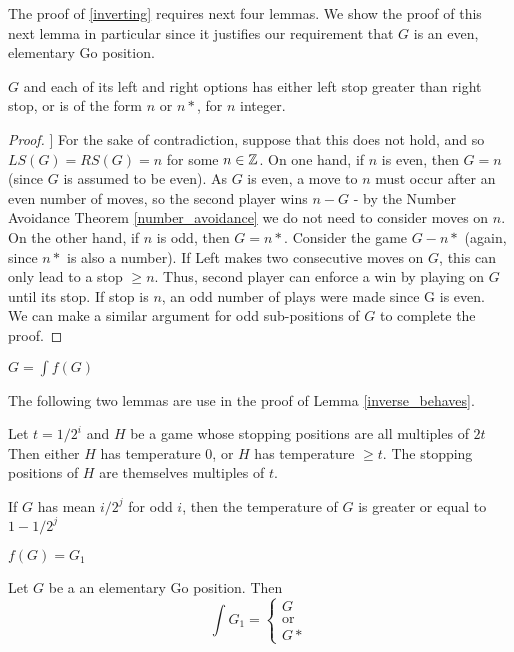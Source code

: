 \documentclass[../math194_paper.tex]{subfiles}
\begin{document}
 The proof of \ref{inverting} requires next four lemmas. We show the proof of this next
 lemma in particular since it justifies our requirement that $G$ is an even, elementary Go position.
\begin{lemma}
    $G$ and each of its left and right options has either left stop greater than 
    right stop, or is of the form $n$ or $n*$, for $n$ integer.
\end{lemma}
\begin{proof} \:
    [\cite{berlekamp1994mathematical}[\S 3.6]]
    For the sake of contradiction, suppose that this does not hold, and
    so $LS(G) = RS(G) = n$ for some $n \in \mathbb{Z}$. 
    On one hand, if $n$ is even, then $G = n$ (since $G$ is assumed to be even). As $G$ is even, 
    a move to $n$ must occur after an even number of moves, so the second player wins
    $n -G$ - by the Number Avoidance Theorem \ref{number_avoidance} we do not need to consider moves
    on $n$. \\
    On the other hand, if $n$ is odd, then $G = n*$. Consider the game $G - n*$ (again, 
    since $n*$ is also a number). If Left makes two consecutive moves on $G$, this can only lead 
    to a stop $\geq n$. Thus, second player can enforce a win by playing on $G$ until its stop. If 
    stop is $n$, an odd number of plays were made since G is even.\\
    
    We can make a similar argument for odd sub-positions of $G$ to complete the proof.
\end{proof}

\begin{lemma}
    \label{warming_inverse}
    $G  = \int f(G)$
\end{lemma}

The following two lemmas are use in the proof of Lemma \ref{inverse_behaves}.
\begin{lemma}
    Let $t=1/2^i$ and $H$ be a game whose stopping positions are all multiples of 
    $2t$ Then either $H$ has temperature 0, or $H$ has temperature $\geq t$. 
    The stopping positions of $H$ are themselves multiples of $t$.
\end{lemma}

\begin{lemma}
    If $G$ has mean $i/2^j$ for odd $i$, then the temperature of $G$ is 
    greater or equal to $1 - 1/2^j$
\end{lemma}

\begin{lemma}
    \label{inverse_behaves}
    $f(G) = G_1$
\end{lemma}

\begin{corollary}
    \label{inverting_dame}
    Let $G$ be a an elementary Go position. Then
    \[\int G_1 = \begin{cases}
        G \\
        \text{or} \\ 
        G*
    \end{cases}\]
\end{corollary}
\end{document}
